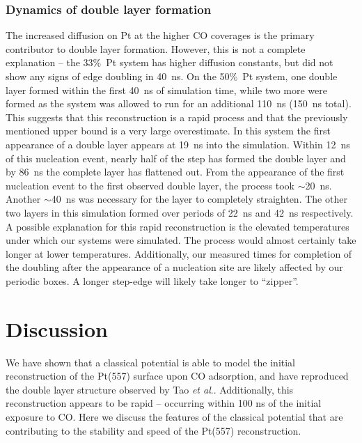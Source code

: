 \subsubsection{Dynamics of double layer formation}
The increased diffusion on Pt at the higher CO coverages is the primary 
contributor to double layer formation. However, this is not a complete 
explanation -- the 33\%~Pt system has higher diffusion constants, but 
did not show any signs of edge doubling in 40~ns. On the 50\%~Pt 
system, one double layer formed within the first 40~ns of simulation time, 
while two more were formed as the system was allowed to run for an 
additional 110~ns (150~ns total). This suggests that this reconstruction 
is a rapid process and that the previously mentioned upper bound is a 
very large overestimate.\citep{Williams:1991qd,Pearl:2001ca} In this system the first 
appearance of a double layer appears at 19~ns into the simulation. 
Within 12~ns of this nucleation event, nearly half of the step has formed 
the double layer and by 86~ns the complete layer has flattened out. 
From the appearance of the first nucleation event to the first observed 
double layer, the process took $\sim$20~ns. Another $\sim$40~ns was 
necessary for the layer to completely straighten. The other two layers in 
this simulation formed over periods of 22~ns and 42~ns respectively. 
A possible explanation for this rapid reconstruction is the elevated 
temperatures under which our systems were simulated. The process 
would almost certainly take longer at lower temperatures. Additionally, 
our measured times for completion of the doubling after the appearance 
of a nucleation site are likely affected by our periodic boxes. A longer 
step-edge will likely take longer to ``zipper''. 


\section{Discussion}
We have shown that a classical potential is able to model the initial
reconstruction of the Pt(557) surface upon CO adsorption, and have
reproduced the double layer structure observed by Tao {\it et
  al}.\citep{Tao:2010aa}. Additionally, this reconstruction appears to be
rapid -- occurring within 100 ns of the initial exposure to CO.  Here
we discuss the features of the classical potential that are
contributing to the stability and speed of the Pt(557) reconstruction.

